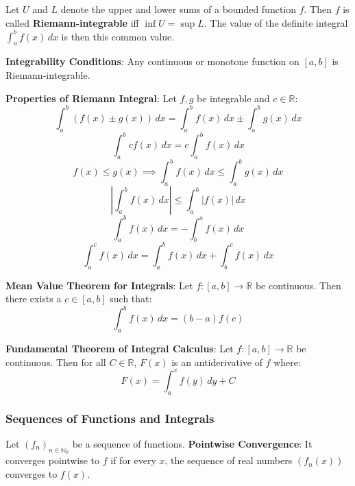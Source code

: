 \begin{definition}
    Let $U$ and $L$ denote the upper and lower sums of a bounded function $f$. Then $f$ is called \textbf{Riemann-integrable} iff $\inf U = \sup L$. The value of the definite integral $\int_a^b f(x) \, dx$ is then this common value.
\end{definition}

\begin{theorem}
    \textbf{Integrability Conditions}: Any continuous or monotone function on $[a, b]$ is Riemann-integrable.
\end{theorem}

\begin{theorem}
    \textbf{Properties of Riemann Integral}: Let $f, g$ be integrable and $c \in \mathbb{R}$:
    $$\int_a^b (f(x) \pm g(x)) \, dx = \int_a^b f(x) \, dx \pm \int_a^b g(x) \, dx$$
    $$\int_a^b c f(x) \, dx = c \int_a^b f(x) \, dx$$
    $$f(x) \leq g(x) \implies \int_a^b f(x) \, dx \leq \int_a^b g(x) \, dx$$
    $$\left| \int_a^b f(x) \, dx \right| \leq \int_a^b |f(x)| \, dx$$
    $$\int_{a}^{b} f(x) \, dx = -\int_{b}^{a} f(x) \, dx$$
    $$\int_{a}^{c} f(x) \, dx = \int_{a}^{b} f(x) \, dx + \int_{b}^{c} f(x) \, dx$$
\end{theorem}

\begin{theorem}
    \textbf{Mean Value Theorem for Integrals}: Let $f: [a,b] \to \mathbb{R}$ be continuous. Then there exists a $c \in [a,b]$ such that:
    $$\int_{a}^{b} f(x) \, dx = (b-a)f(c)$$
\end{theorem}

\begin{theorem}
    \textbf{Fundamental Theorem of Integral Calculus}: Let $f: [a,b] \to \mathbb{R}$ be continuous. Then for all $C \in \mathbb{R}$, $F(x)$ is an antiderivative of $f$ where:
    $$F(x) = \int_{a}^{x} f(y) \, dy + C$$
\end{theorem}

\subsubsection{Sequences of Functions and Integrals}

\begin{definition}
    Let $(f_n)_{n \in \mathbb{N}_0}$ be a sequence of functions.
    \textbf{Pointwise Convergence}: It converges pointwise to $f$ if for every $x$, the sequence of real numbers $(f_n(x))$ converges to $f(x)$.
\end{definition}

